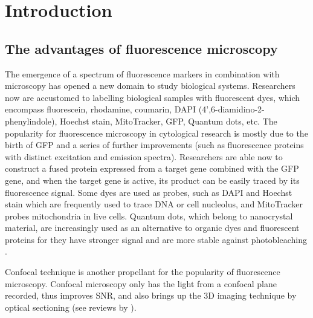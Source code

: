 
\cleardoublepage {} {}
\chapter*{Introduction}
\renewcommand{\thesection}{\arabic{section}}

\section{The advantages of fluorescence microscopy}

The emergence of a spectrum of fluorescence markers in combination with microscopy has opened a new domain to study biological systems. Researchers now are accustomed to labelling biological samples with fluorescent dyes, which encompass fluorescein, rhodamine, coumarin, DAPI (4',6-diamidino-2-phenylindole), Hoechst stain, MitoTracker, GFP, Quantum dots, etc.
 The popularity for fluorescence microscopy in cytological research is mostly due to the birth of \ac{GFP} and a series of further improvements (such as fluorescence proteins with distinct excitation and emission spectra). Researchers are able now to construct a fused protein expressed from a target gene combined with the \ac{GFP} gene, and when the target gene is active, its product can be easily traced by its fluorescence signal.
 Some dyes are used as probes, such as DAPI and Hoechst stain which are frequently used to trace DNA or cell nucleolus, and MitoTracker probes mitochondria in live cells. Quantum dots, which belong to nanocrystal material, are increasingly used as an alternative to organic dyes and fluorescent proteins for they have stronger signal and are more stable against photobleaching \parencite{Walling2009Quantum}.


Confocal technique is another propellant for the popularity of fluorescence microscopy. Confocal microscopy only has the light from a confocal plane recorded, thus improves \ac{SNR}, and also brings up the 3D imaging technique by optical sectioning (see reviews by \Cite{Agard1984Optical, Conchello2005Optical}).

